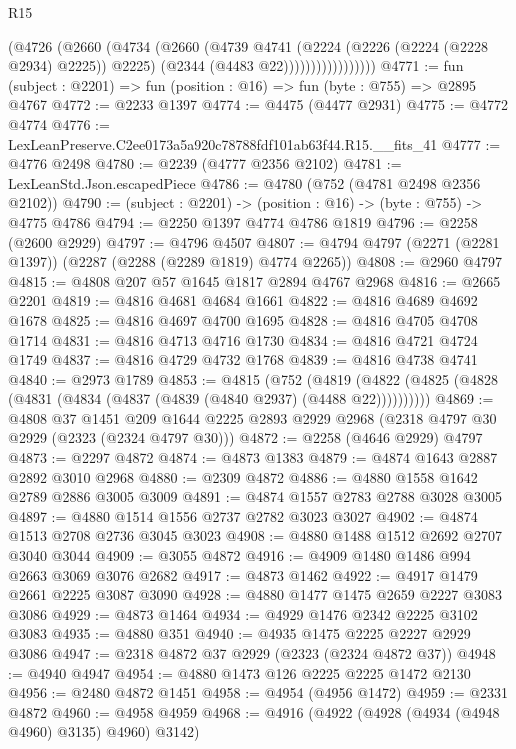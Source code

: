 \begin{lexlean}{R15}
\begin{coremodule}
                        (@4726
                          (@2660
                            (@4734
                              (@2660
                                (@4739
                                  @4741
                                  (@2224 (@2226 (@2224 (@2228 @2934) @2225)) @2225)
                                  (@2344 (@4483 @22)))))))))))))))))
@4771 := fun (subject : @2201) => fun (position : @16) => fun (byte : @755) => @2895 @4767
@4772 := @2233 @1397
@4774 := @4475 (@4477 @2931)
@4775 := @4772 @4774
@4776 := LexLeanPreserve.C2ee0173a5a920c78788fdf101ab63f44.R15.__fits_41
@4777 := @4776 @2498
@4780 := @2239 (@4777 @2356 @2102)
@4781 := LexLeanStd.Json.escapedPiece
@4786 := @4780 (@752 (@4781 @2498 @2356 @2102))
@4790 := (subject : @2201) -> (position : @16) -> (byte : @755) -> @4775 @4786
@4794 := @2250 @1397 @4774 @4786 @1819
@4796 := @2258 (@2600 @2929)
@4797 := @4796 @4507
@4807 := @4794 @4797 (@2271 (@2281 @1397)) (@2287 (@2288 (@2289 @1819) @4774 @2265))
@4808 := @2960 @4797
@4815 := @4808 @207 @57 @1645 @1817 @2894 @4767 @2968
@4816 := @2665 @2201
@4819 := @4816 @4681 @4684 @1661
@4822 := @4816 @4689 @4692 @1678
@4825 := @4816 @4697 @4700 @1695
@4828 := @4816 @4705 @4708 @1714
@4831 := @4816 @4713 @4716 @1730
@4834 := @4816 @4721 @4724 @1749
@4837 := @4816 @4729 @4732 @1768
@4839 := @4816 @4738 @4741
@4840 := @2973 @1789
@4853 := @4815
    (@752 (@4819 (@4822 (@4825 (@4828 (@4831 (@4834 (@4837 (@4839 (@4840 @2937) (@4488 @22))))))))))
@4869 := @4808
    @37
    @1451
    @209
    @1644
    @2225
    @2893
    @2929
    @2968
    (@2318 @4797 @30 @2929 (@2323 (@2324 @4797 @30)))
@4872 := @2258 (@4646 @2929) @4797
@4873 := @2297 @4872
@4874 := @4873 @1383
@4879 := @4874 @1643 @2887 @2892 @3010 @2968
@4880 := @2309 @4872
@4886 := @4880 @1558 @1642 @2789 @2886 @3005 @3009
@4891 := @4874 @1557 @2783 @2788 @3028 @3005
@4897 := @4880 @1514 @1556 @2737 @2782 @3023 @3027
@4902 := @4874 @1513 @2708 @2736 @3045 @3023
@4908 := @4880 @1488 @1512 @2692 @2707 @3040 @3044
@4909 := @3055 @4872
@4916 := @4909 @1480 @1486 @994 @2663 @3069 @3076 @2682
@4917 := @4873 @1462
@4922 := @4917 @1479 @2661 @2225 @3087 @3090
@4928 := @4880 @1477 @1475 @2659 @2227 @3083 @3086
@4929 := @4873 @1464
@4934 := @4929 @1476 @2342 @2225 @3102 @3083
@4935 := @4880 @351
@4940 := @4935 @1475 @2225 @2227 @2929 @3086
@4947 := @2318 @4872 @37 @2929 (@2323 (@2324 @4872 @37))
@4948 := @4940 @4947
@4954 := @4880 @1473 @126 @2225 @2225 @1472 @2130
@4956 := @2480 @4872 @1451
@4958 := @4954 (@4956 @1472)
@4959 := @2331 @4872
@4960 := @4958 @4959
@4968 := @4916 (@4922 (@4928 (@4934 (@4948 @4960) @3135) @4960) @3142)

\end{coremodule}
\end{lexlean}
